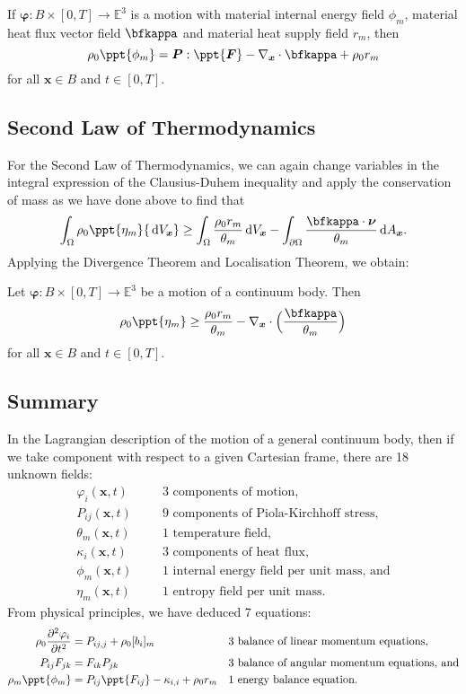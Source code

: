 \documentclass[
  letterpaper,
  DIV=11,
  numbers=noendperiod]{scrreprt}
\theoremstyle{plain}
\theoremstyle{remark}
\begin{document}
If \({\boldsymbol{\varphi}}:B\times[0,T]\to{\mathbb{E}}^3\) is a motion
with material internal energy field \(\phi_m\), material heat flux
vector field \(\bfkappa\) and material heat supply field \(r_m\), then
\[\rho_0\ppt{\phi_m} = {\boldsymbol{P}}:\ppt{\boldsymbol{F}}-\nabla_{\boldsymbol{x}}\cdot\bfkappa+\rho_0r_m\]
for all \({\boldsymbol{x}}\in B\) and \(t\in[0,T]\).

\subsection{Second Law of
Thermodynamics}\label{second-law-of-thermodynamics-1}

For the Second Law of Thermodynamics, we can again change variables in
the integral expression of the Clausius-Duhem inequality and apply the
conservation of mass as we have done above to find that
\[\int_\Omega \rho_0\ppt{\eta_m}{\,{\mathrm{d}}V_{{\boldsymbol{x}}}}\geq \int_{\Omega}\frac{\rho_0r_m}{\theta_m}{\,{\mathrm{d}}V_{{\boldsymbol{x}}}}-\int_{\partial \Omega} \frac{\bfkappa\cdot{\boldsymbol{\nu}}}{\theta_m}{\,{\mathrm{d}}A_{{\boldsymbol{x}}}}.\]
Applying the Divergence Theorem and Localisation Theorem, we obtain:

Let \({\boldsymbol{\varphi}}:B\times[0,T]\to{\mathbb{E}}^3\) be a motion
of a continuum body. Then
\[\rho_0\ppt{\eta_m}\geq \frac{\rho_0 r_m}{\theta_m}-\nabla_{\boldsymbol{x}}\cdot\Big(\frac{\bfkappa}{\theta_m}\Big)\]
for all \({\boldsymbol{x}}\in B\) and \(t\in[0,T]\).

\subsection{Summary}\label{summary-1}

In the Lagrangian description of the motion of a general continuum body,
then if we take component with respect to a given Cartesian frame, there
are 18 unknown fields: \[\begin{aligned}
    \varphi_i({\boldsymbol{x}},t) &&&\text{3 components of motion,}\\
    P_{ij}({\boldsymbol{x}},t) &&&\text{9 components of Piola-Kirchhoff stress,}\\
    \theta_m({\boldsymbol{x}},t) &&&\text{1 temperature field,}\\
    \kappa_i({\boldsymbol{x}},t) &&&\text{3 components of heat flux,}\\
    \phi_m({\boldsymbol{x}},t) &&&\text{1 internal energy field per unit mass, and}\\
    \eta_m({\boldsymbol{x}},t) &&&\text{1 entropy field per unit mass.}
  \end{aligned}\] From physical principles, we have deduced 7 equations:
\[\begin{aligned}[]
    \rho_0\frac{\partial ^2\varphi_i}{\partial t^2} &= P_{ij,j}+\rho_0[b_i]_m&& \text{3 balance of linear momentum equations,}\\
    P_{ij}F_{jk} &= F_{ik}P_{jk} && \text{3 balance of angular momentum equations, and}\\
    \rho_m\ppt{\phi_m} &= P_{ij}\ppt{F_{ij}}-\kappa_{i,i}+\rho_0 r_m &&\text{1 energy balance equation.}
  \end{aligned}\]
\end{document}
